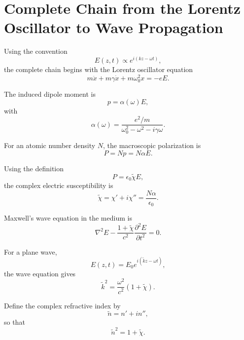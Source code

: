 \documentclass[11pt]{article}
\begin{document}
\section*{Complete Chain from the Lorentz Oscillator to Wave Propagation}

Using the convention
\begin{equation}
E(z,t)\propto e^{i(kz-\omega t)},
\end{equation}
the complete chain begins with the Lorentz oscillator equation
\begin{equation}
m\ddot{x}+m\gamma\dot{x}+m\omega_0^2x=-eE.
\end{equation}

The induced dipole moment is
\begin{equation}
p=\alpha(\omega)E,
\end{equation}
with
\begin{equation}
\alpha(\omega)
=
\frac{e^2/m}
{\omega_0^2-\omega^2-i\gamma\omega}.
\end{equation}

For an atomic number density \(N\), the macroscopic polarization is
\begin{equation}
P=Np=N\alpha E.
\end{equation}

Using the definition
\begin{equation}
P=\epsilon_0\tilde{\chi}E,
\end{equation}
the complex electric susceptibility is
\begin{equation}
\tilde{\chi}
=
\chi'+i\chi''
=
\frac{N\alpha}{\epsilon_0}.
\end{equation}

Maxwell's wave equation in the medium is
\begin{equation}
\nabla^2E
-
\frac{1+\tilde{\chi}}{c^2}
\frac{\partial^2E}{\partial t^2}
=0.
\end{equation}

For a plane wave,
\begin{equation}
E(z,t)=E_0e^{i(\tilde{k}z-\omega t)},
\end{equation}
the wave equation gives
\begin{equation}
\tilde{k}^2
=
\frac{\omega^2}{c^2}(1+\tilde{\chi}).
\end{equation}

Define the complex refractive index by
\begin{equation}
\tilde{n}=n'+in'',
\end{equation}
so that
\begin{equation}
\tilde{n}^2=1+\tilde{\chi}.
\end{equation}
\end{document}
